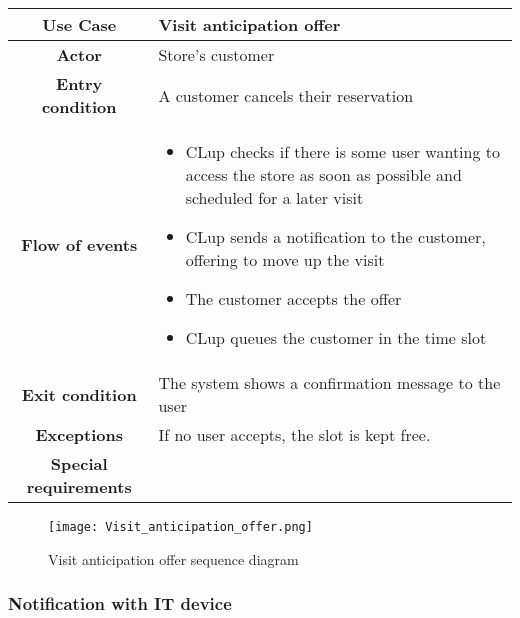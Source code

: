 \documentclass[../../main.tex]{subfiles}
\begin{document}
      \begin{table}[H]
        \centering
          \begin{tabular}{c m{}}
          \hline
          \textbf{Use Case} & Visit anticipation offer\\ \hline
          \textbf{Actor} & Store's customer\\ \hline
          \textbf{Entry condition} & A customer cancels their reservation\\  \hline
          \textbf{Flow of events} & \begin{itemize}
                                      \item CLup checks if there is some user wanting to access the store as soon as possible and scheduled for a later visit
                                      \item CLup sends a notification to the customer, offering to move up the visit
                                      \item The customer accepts the offer
                                      \item CLup queues the customer in the time slot
                                    \end{itemize}\\ \hline
          \textbf{Exit condition} & The system shows a confirmation message to the user \\ \hline
          \textbf{Exceptions} & If no user accepts, the slot is kept free. \\ \hline
          \textbf{Special requirements} &\\ \hline
          \end{tabular}
      \end{table}

      \begin{figure}[H]
        \centering
        \texttt{[image: Visit\_anticipation\_offer.png]}
        \caption{Visit anticipation offer sequence diagram}
      \end{figure}


      \subsubsection{Notification with IT device}
\end{document}
